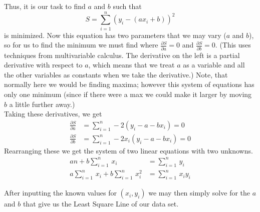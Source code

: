 Thus, it is our task to find $a$ and $b$ such that 
	\[
	S= \sum_{i=1}^n (y_i - (ax_i+b))^2
	\]
 is minimized. Now this equation has two parameters that we may vary ($a$ and $b$), so for us to find the minimum we must find where $\frac{\partial S}{\partial a}=0$ and $\frac{\partial S}{\partial b}=0$. (This uses techniques from multivariable calculus. The derivative on the left is a partial derivative with respect to $a$, which means that we treat $a$ as a variable and all the other variables as constants when we take the derivative.) Note, that normally here we would be finding maxima; however this system of equations has only one minimum (since if there were a max we could make it larger by moving $b$ a little further away.) \\

Taking these derivatives, we get
	\[
	\begin{split}
	\frac{\partial S}{\partial a}&= \sum_{i=1}^n -2(y_i-a-bx_i) =0 \\
	\frac{\partial S}{\partial b}&= \sum_{i=1}^n -2x_i(y_i -a-bx_i)=0
	\end{split}
	\]
Rearranging these we get the system of two linear equations with two unknowns. 
	\[
	\begin{split}
	an+b \sum_{i=1}^n \,x_i &= \sum_{i=1}^n \,y_i \\
	a \sum_{i=1}^n \,x_i + b \sum_{i=1}^n \,x_i^2 &= \sum_{i=1}^n \,x_i y_i
	\end{split}
	\]

After inputting the known values for $(x_i, y_i)$ we may then simply solve for the $a$ and $b$ that give us the Least Square Line of our data set.

 \vspace{0.2cm}

 \vspace{0.2cm}

